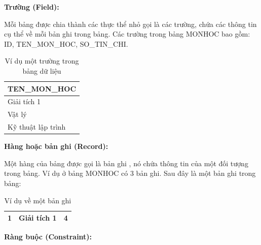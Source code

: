 \textbf{Trường (Field):}
	
	Mỗi bảng được chia thành các thực thể nhỏ gọi là các trường, chứa các thông tin cụ thể về mỗi bản ghi trong bảng. Các trường trong bảng MONHOC bao gồm: ID, TEN\_MON\_HOC, SO\_TIN\_CHI.\\
	\begin{table}[H]
	    \centering
	    \begin{tabular}{|l|}
	        \hline
	        \textbf{TEN\_MON\_HOC}\\
	        \hline
	        Giải tích 1\\
	        \hline
	        Vật lý\\
	        \hline
	        Kỹ thuật lập trình\\
	        \hline
	    \end{tabular}
	    \caption{Ví dụ một trường trong bảng dữ liệu}
	\end{table}
	
\textbf{Hàng hoặc bản ghi (Record):}
	
Một hàng của bảng được gọi là bản ghi , nó chứa thông tin của một đối tượng trong bảng. Ví dụ ở bảng MONHOC có 3 bản ghi. Sau đây là một bản ghi trong bảng:\\
\begin{table}[H]
    \centering
    \begin{tabular}{|r|r|r|}
        \hline
		1&Giải tích 1&4\\
		\hline
    \end{tabular}
    \caption{Ví dụ về một bản ghi}
\end{table}
\newpage
\textbf{Ràng buộc (Constraint):}

